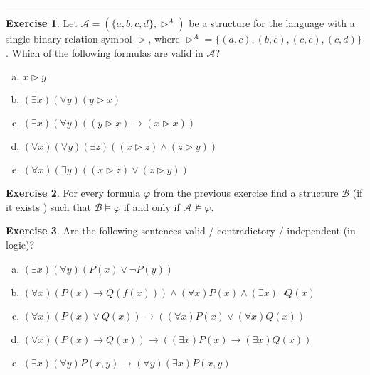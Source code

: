 \documentclass[11pt,a4paper]{amsart}
\theoremstyle{definition}
\newtheorem{problem}{Exercise}
\begin{document}
\hrule

\bigskip\begin{problem}
Let $\mathcal{A}=(\{a,b,c,d\},\vartriangleright^{A})$ be a structure for the language with a single binary relation symbol $\vartriangleright$, where $\vartriangleright^{A}=\{(a,c), (b,c), (c,c), (c,d)\}$. Which of the following formulas are valid in $\mathcal A$?
\begin{enumerate}[(a)]
   \item $x \vartriangleright y$
   \item $(\exists x)(\forall y)(y \vartriangleright x)$
   \item $(\exists x)(\forall y)((y \vartriangleright x) \to (x \vartriangleright x))$
   \item $(\forall x)(\forall y)(\exists z)((x \vartriangleright z)\wedge(z \vartriangleright y))$
   \item $(\forall x)(\exists y)((x \vartriangleright z)\vee(z \vartriangleright y))$
\end{enumerate}
\end{problem}

\bigskip\begin{problem}
For every formula $\varphi$ from the previous exercise find a structure $\mathcal{B}$ (if it exists ) such that $\mathcal{B}\models \varphi$ if and only if $\mathcal{A}\not\models \varphi$.
\end{problem}



\bigskip\begin{problem}
Are the following sentences valid / contradictory / independent (in logic)?
\begin{enumerate}[(a)]
 \item $(\exists x)(\forall y)(P(x) \vee \neg P(y))$
\item $(\forall x)(P(x)\to Q(f(x))) \wedge (\forall x)P(x) \wedge (\exists x)\neg Q(x)$
  \item $(\forall x)(P(x) \vee Q(x)) \to ((\forall x)P(x) \vee (\forall x)Q(x))$
   \item $(\forall x)(P(x)\to Q(x)) \to ((\exists x)P(x)\to(\exists x)Q(x))$
\item $(\exists x)(\forall y)P(x,y) \to (\forall y)(\exists x)P(x,y)$
\end{enumerate}
\end{problem}
\end{document}
